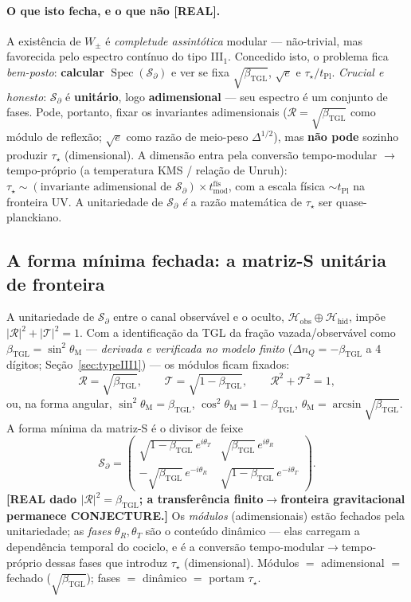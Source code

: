 \documentclass[12pt,a4paper]{article}
\newcommand{\betatgl}{\beta_{\text{TGL}}}
\newcommand{\thetaM}{\theta_{\text{M}}}
\newcommand{\TGL}{\textsc{TGL}}
\begin{document}
\paragraph{O que isto fecha, e o que não \textbf{[REAL]}.} A existência de $W_\pm$ é \emph{completude assintótica} modular --- não-trivial, mas favorecida pelo espectro contínuo do tipo III$_1$.  Concedido isto, o problema fica \emph{bem-posto}: \textbf{calcular} $\operatorname{Spec}(\mathcal S_\partial)$ e ver se fixa $\sqrt{\betatgl}$, $\sqrt e$ e $\tau_\star/t_{\mathrm{Pl}}$.  \emph{Crucial e honesto}: $\mathcal S_\partial$ é \textbf{unitário}, logo \textbf{adimensional} --- seu espectro é um conjunto de fases.  Pode, portanto, fixar os invariantes adimensionais ($\mathcal R=\sqrt{\betatgl}$ como módulo de reflexão; $\sqrt e$ como razão de meio-peso $\Delta^{1/2}$), mas \textbf{não pode} sozinho produzir $\tau_\star$ (dimensional).  A dimensão entra pela conversão tempo-modular $\to$ tempo-próprio (a temperatura KMS / relação de Unruh): $\tau_\star\sim(\text{invariante adimensional de }\mathcal S_\partial)\times t^{\mathrm{fís}}_{\mathrm{mod}}$, com a escala física $\sim t_{\mathrm{Pl}}$ na fronteira UV.  A unitariedade de $\mathcal S_\partial$ \emph{é} a razão matemática de $\tau_\star$ ser quase-planckiano.

\subsection{A forma mínima fechada: a matriz-S unitária de fronteira}
A unitariedade de $\mathcal S_\partial$ entre o canal observável e o oculto, $\mathcal H_{\mathrm{obs}}\oplus\mathcal H_{\mathrm{hid}}$, impõe $|\mathcal R|^2+|\mathcal T|^2=1$.  Com a identificação da \TGL{} da fração vazada/observável como $\betatgl=\sin^2\thetaM$ --- \emph{derivada e verificada no modelo finito} ($\Delta n_Q=-\betatgl$ a 4 dígitos; Seção~\ref{sec:typeIII1}) --- os módulos ficam fixados:
\begin{equation}
\mathcal R=\sqrt{\betatgl},\qquad \mathcal T=\sqrt{1-\betatgl},\qquad \mathcal R^2+\mathcal T^2=1,
\end{equation}
ou, na forma angular, $\sin^2\thetaM=\betatgl$, $\cos^2\thetaM=1-\betatgl$, $\thetaM=\arcsin\sqrt{\betatgl}$.  A forma mínima da matriz-S é o divisor de feixe
\begin{equation}
\mathcal S_\partial=\begin{pmatrix}\sqrt{1-\betatgl}\,e^{i\theta_T}&\sqrt{\betatgl}\,e^{i\theta_R}\\-\sqrt{\betatgl}\,e^{-i\theta_R}&\sqrt{1-\betatgl}\,e^{-i\theta_T}\end{pmatrix}.
\end{equation}
\textbf{[REAL dado $|\mathcal R|^2=\betatgl$; a transferência finito$\to$fronteira gravitacional permanece CONJECTURE.]}  Os \emph{módulos} (adimensionais) estão fechados pela unitariedade; as \emph{fases} $\theta_R,\theta_T$ são o conteúdo dinâmico --- elas carregam a dependência temporal do cociclo, e é a conversão tempo-modular$\to$tempo-próprio dessas fases que introduz $\tau_\star$ (dimensional). Módulos $=$ adimensional $=$ fechado ($\sqrt{\betatgl}$); fases $=$ dinâmico $=$ portam $\tau_\star$.
\end{document}
